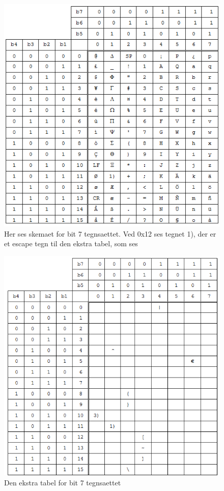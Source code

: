 \begin{figure}[H]
\includegraphics []{Billeder/tegnsaet.png}
\caption {Her ses skemaet for bit 7 tegnsaettet. Ved 0x12 ses tegnet 1), der er et escape tegn til den ekstra tabel, som ses }
\label {tegnsaet}
\end{figure}

\begin{figure}[H]
\includegraphics []{Billeder/tegnsaet2.png}
\caption {Den ekstra tabel for bit 7 tegnsaettet}
\label {tegnsaet2}
\end{figure}
